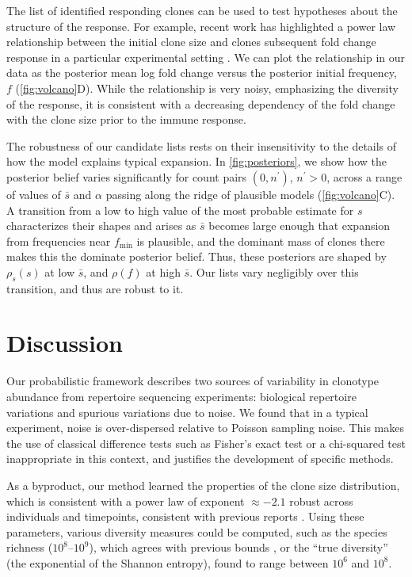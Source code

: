 \documentclass[pre,twocolumn,english,longbibliography]{revtex4}
\newcommand{\<}{\langle}
\renewcommand{\>}{\rangle}
\begin{document}
The list of identified responding clones can be used to test hypotheses about the structure of the response. For example, recent work has highlighted a power law relationship between the initial clone size and clones subsequent fold change response in a particular experimental setting \cite{Mayer2019}. We can plot the relationship in our data as the posterior mean log fold change versus the posterior initial frequency, $f$ (\cref{fig:volcano}D). While the relationship is very noisy, emphasizing the diversity of the response, it is consistent with a decreasing dependency of the fold change with the clone size prior to the immune response.

The robustness of our candidate lists rests on their insensitivity to the details of how the model explains typical expansion. In \cref{fig:posteriors}, we show how the posterior belief varies significantly for count pairs $(0,n^\prime)$, $n^\prime>0$, across a range of values of $\bar{s}$ and $\alpha$ passing along the ridge of plausible models (\cref{fig:volcano}C). A transition from a low to high value of the most probable estimate for $s$ characterizes their shapes and arises as $\bar{s}$ becomes large enough that expansion from frequencies near $f_\textrm{min}$ is plausible, and the dominant mass of clones there makes this the dominate posterior belief. Thus, these posteriors are shaped by $\rho_s(s)$ at low $\bar{s}$, and $\rho(f)$ at high $\bar{s}$. Our lists vary negligibly over this transition, and thus are robust to it.



\section*{Discussion}

Our probabilistic framework describes two sources of variability in clonotype abundance from repertoire sequencing experiments: biological repertoire variations and spurious variations due to noise. We found that in a typical experiment, noise is over-dispersed relative to Poisson sampling noise. This makes the use of classical difference tests such as Fisher's exact test or a chi-squared test inappropriate in this context, and justifies the development of specific methods.

As a byproduct, our method learned the properties of the clone size distribution, which is consistent with a power law of exponent $\approx -2.1$ robust across individuals and timepoints, consistent with previous reports \cite{Mora2016e,Gerritsen_thesis,Greef2019}. Using these parameters, various diversity measures could be computed, such as the species richness ($10^8$--$10^9$), which agrees with previous bounds \cite{Qi2014,Lythe2016}, or the ``true diversity'' (the exponential of the Shannon entropy), found to range between $10^6$ and $10^8$.
\end{document}
